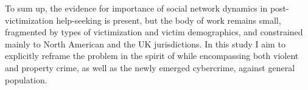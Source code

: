 \documentclass[]{interact}
\theoremstyle{plain}%
\theoremstyle{definition}
\theoremstyle{remark}
\newcommand\citet{\textcite}
\begin{document}
	To sum up, the evidence for importance of social network dynamics in post-victimization help-seeking is present, but the body of work remains small, fragmented by types of victimization and victim demographics, and constrained mainly to North American and the UK jurisdictions. In this study I aim to explicitly reframe the problem in the spirit of \citet{pescosolido1992beyond} while encompassing both violent and property crime, as well as the newly emerged cybercrime, against general population.
	
%	
%	
%	
	
\end{document}
